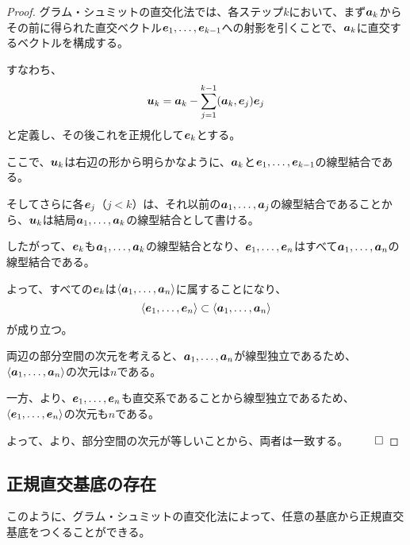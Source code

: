 \documentclass[../../../topic_linear-algebra]{subfiles}
\begin{document}
\begin{proof}
  グラム・シュミットの直交化法では、各ステップ$k$において、まず$\vb*{a}_k$からその前に得られた直交ベクトル$\vb*{e}_1, \ldots, \vb*{e}_{k-1}$への射影を引くことで、$\vb*{a}_k$に直交するベクトルを構成する。

  すなわち、
  \begin{equation*}
    \vb*{u}_k = \vb*{a}_k - \sum_{j=1}^{k-1} (\vb*{a}_k, \vb*{e}_j) \vb*{e}_j
  \end{equation*}
  と定義し、その後これを正規化して$\vb*{e}_k$とする。

  \br

  ここで、$\vb*{u}_k$は右辺の形から明らかなように、$\vb*{a}_k$と$\vb*{e}_1, \ldots, \vb*{e}_{k-1}$の線型結合である。

  そしてさらに各$\vb*{e}_j$（$j < k$）は、それ以前の$\vb*{a}_1, \ldots, \vb*{a}_j$の線型結合であることから、$\vb*{u}_k$は結局$\vb*{a}_1, \ldots, \vb*{a}_k$の線型結合として書ける。

  したがって、$\vb*{e}_k$も$\vb*{a}_1, \ldots, \vb*{a}_k$の線型結合となり、$\vb*{e}_1, \ldots, \vb*{e}_n$はすべて$\vb*{a}_1, \ldots, \vb*{a}_n$の線型結合である。

  \br

  よって、すべての$\vb*{e}_k$は$\langle \vb*{a}_1, \ldots, \vb*{a}_n \rangle$に属することになり、
  \begin{equation*}
    \langle \vb*{e}_1, \ldots, \vb*{e}_n \rangle \subset \langle \vb*{a}_1, \ldots, \vb*{a}_n \rangle
  \end{equation*}
  が成り立つ。

  \br

  両辺の部分空間の次元を考えると、$\vb*{a}_1, \ldots, \vb*{a}_n$が線型独立であるため、$\langle \vb*{a}_1, \ldots, \vb*{a}_n \rangle$の次元は$n$である。

  一方、より、$\vb*{e}_1, \ldots, \vb*{e}_n$も直交系であることから線型独立であるため、$\langle \vb*{e}_1, \ldots, \vb*{e}_n \rangle$の次元も$n$である。

  よって、より、部分空間の次元が等しいことから、両者は一致する。 $\qed$
\end{proof}

\subsection{正規直交基底の存在}

このように、グラム・シュミットの直交化法によって、任意の基底から正規直交基底をつくることができる。
\end{document}
